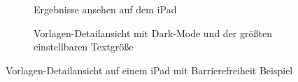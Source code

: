 \documentclass[notables, nomenclature, oneside, 150]{HSMW-Thesis}
\begin{document}
	\begin{figure}[ht]
	    \centering
		\begin{subfigure}[h]{\textwidth}
		    \caption{Ergebnisse ansehen auf dem iPad}
		    \label{fig:pad1}
		\end{subfigure}
		
       	\begin{subfigure}[h]{\textwidth}
		    \caption{Vorlagen-Detailansicht mit Dark-Mode und der größten einstellbaren Textgröße}
		    \label{fig:pad2}
		\end{subfigure}
    	\caption{Vorlagen-Detailansicht auf einem iPad mit Barrierefreiheit Beispiel}
		\label{fig:zusatz5}
	\end{figure}
	
\end{document}
